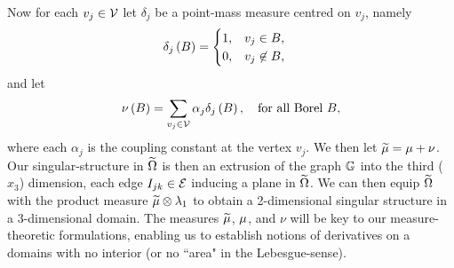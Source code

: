 Now for each $v_j\in\mathcal{V}$ let $\delta_j$ be a point-mass measure centred on $v_j$, namely
\begin{align*}
	\delta_j\left( B \right) &= \begin{cases} 1, & v_j\in B, \\ 0, & v_j\not\in B, \end{cases}
\end{align*}
and let
\begin{align*}
	\nu\left( B \right) = \sum_{v_j\in\mathcal{V}}\alpha_j\delta_j\left( B \right),
	\quad\text{for all Borel } B,
\end{align*}
where each $\alpha_j$ is the coupling constant at the vertex $v_j$.
We then let $\widetilde{\mu} = \mu + \nu$.
Our singular-structure in $\widetilde{\Omega}$ is then an extrusion of the graph $\mathbb{G}$ into the third ($x_3$) dimension, each edge $I_{jk}\in\mathcal{E}$ inducing a plane in $\widetilde{\Omega}$.
We can then equip $\widetilde{\Omega}$ with the product measure $\widetilde{\mu}\otimes\lambda_{1}$ to obtain a 2-dimensional singular structure in a 3-dimensional domain.
The measures $\widetilde{\mu}$, $\mu$, and $\nu$ will be key to our measure-theoretic formulations, enabling us to establish notions of derivatives on a domains with no interior (or no ``area" in the Lebesgue-sense).

